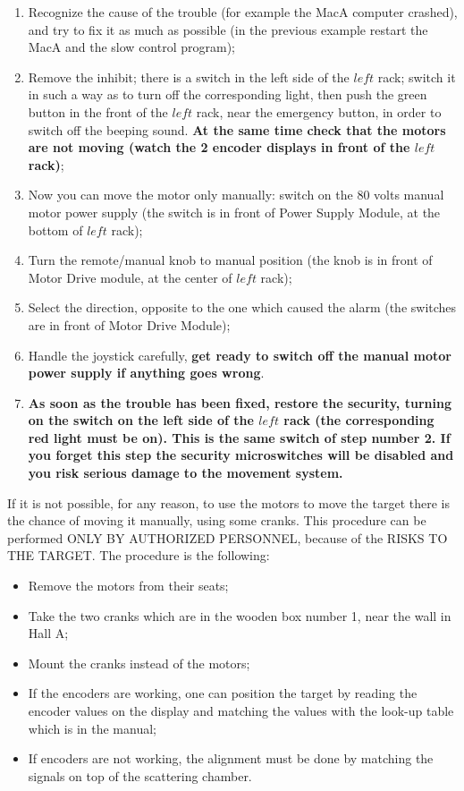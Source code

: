 \begin{enumerate}
 \item Recognize the cause of the trouble
        (for example the MacA computer crashed),
        and try to fix it as much as possible (in the previous example restart
        the MacA and the slow control program); 
 \item Remove the inhibit; there is a switch in the left side of the
  	$left$ rack; switch it in such a way as
  	to turn off the corresponding light, then push the green button in the
  	front of the $left$ rack, near the emergency button, in order
  	to switch off the beeping sound.
  	{\bf At the same time check that the motors are not moving
  	(watch the 2 encoder displays in front of the $left$ rack)};
 \item Now you can move the motor only manually:
  	switch on the 80 volts manual motor power supply (the switch is in
	front of Power Supply Module, at the bottom of $left$ rack);
 \item Turn the remote/manual knob to manual position (the knob is in
  	front of Motor Drive module, at the center of $left$ rack);
 \item Select the direction, opposite to the one which caused the alarm
  	(the switches are in front of Motor Drive Module);
 \item Handle the joystick carefully,
    	{\bf get ready to switch off the manual motor power supply if
 	anything goes wrong}.
 \item {\bf As soon as the trouble has been fixed, restore the security,
  	turning on the switch on the left side of the $left$ rack (the 
	corresponding red light must be on). This is the same switch of 
	step number 2. If you forget this step the security microswitches
  	will be disabled and you risk serious damage to the movement system.}
\end{enumerate}


If it is not possible, for any reason, to use the motors to move the target 
there is the chance of moving it manually, using some cranks. This procedure 
can be performed ONLY BY AUTHORIZED PERSONNEL, because of the
 RISKS TO THE TARGET. The procedure is the following:
\begin{itemize}
\item Remove the motors from their seats;
\item Take the two cranks which are in the wooden box number 1, near the wall 
	in Hall A;
\item Mount the cranks instead of the motors;
\item If the encoders are working, one can position the target by reading the 
 	encoder values on the display and matching the values with the look-up
 	table  which is in the manual;
\item If encoders are not working, the alignment must be done by matching the 
 	signals on top of the scattering chamber.
\end{itemize}

